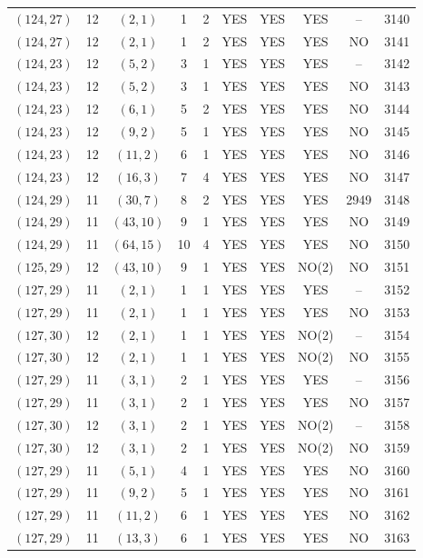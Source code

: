 \begin{longtable}{|c|c|c|c|c|c|c|c|c|c|}
$(124, 27)$ & 12 & $(2, 1)$ & 1 & 2 & YES & YES & YES & -- & 3140\\
$(124, 27)$ & 12 & $(2, 1)$ & 1 & 2 & YES & YES & YES & NO & 3141\\
$(124, 23)$ & 12 & $(5, 2)$ & 3 & 1 & YES & YES & YES & -- & 3142\\
$(124, 23)$ & 12 & $(5, 2)$ & 3 & 1 & YES & YES & YES & NO & 3143\\
$(124, 23)$ & 12 & $(6, 1)$ & 5 & 2 & YES & YES & YES & NO & 3144\\
$(124, 23)$ & 12 & $(9, 2)$ & 5 & 1 & YES & YES & YES & NO & 3145\\
$(124, 23)$ & 12 & $(11, 2)$ & 6 & 1 & YES & YES & YES & NO & 3146\\
$(124, 23)$ & 12 & $(16, 3)$ & 7 & 4 & YES & YES & YES & NO & 3147\\
$(124, 29)$ & 11 & $(30, 7)$ & 8 & 2 & YES & YES & YES & 2949 & 3148\\
$(124, 29)$ & 11 & $(43, 10)$ & 9 & 1 & YES & YES & YES & NO & 3149\\
$(124, 29)$ & 11 & $(64, 15)$ & 10 & 4 & YES & YES & YES & NO & 3150\\
$(125, 29)$ & 12 & $(43, 10)$ & 9 & 1 & YES & YES & NO(2) & NO & 3151\\
$(127, 29)$ & 11 & $(2, 1)$ & 1 & 1 & YES & YES & YES & -- & 3152\\
$(127, 29)$ & 11 & $(2, 1)$ & 1 & 1 & YES & YES & YES & NO & 3153\\
$(127, 30)$ & 12 & $(2, 1)$ & 1 & 1 & YES & YES & NO(2) & -- & 3154\\
$(127, 30)$ & 12 & $(2, 1)$ & 1 & 1 & YES & YES & NO(2) & NO & 3155\\
$(127, 29)$ & 11 & $(3, 1)$ & 2 & 1 & YES & YES & YES & -- & 3156\\
$(127, 29)$ & 11 & $(3, 1)$ & 2 & 1 & YES & YES & YES & NO & 3157\\
$(127, 30)$ & 12 & $(3, 1)$ & 2 & 1 & YES & YES & NO(2) & -- & 3158\\
$(127, 30)$ & 12 & $(3, 1)$ & 2 & 1 & YES & YES & NO(2) & NO & 3159\\
$(127, 29)$ & 11 & $(5, 1)$ & 4 & 1 & YES & YES & YES & NO & 3160\\
$(127, 29)$ & 11 & $(9, 2)$ & 5 & 1 & YES & YES & YES & NO & 3161\\
$(127, 29)$ & 11 & $(11, 2)$ & 6 & 1 & YES & YES & YES & NO & 3162\\
$(127, 29)$ & 11 & $(13, 3)$ & 6 & 1 & YES & YES & YES & NO & 3163\\

\end{longtable}

